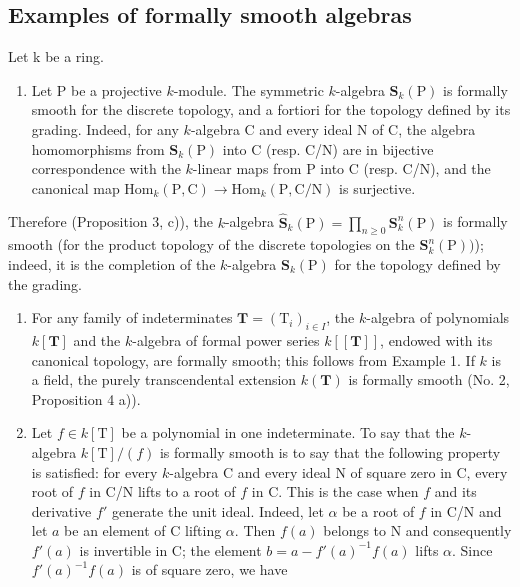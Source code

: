 \subsection{Examples of formally smooth algebras}

Let k be a ring.

\begin{enumerate}
\def\labelenumi{\arabic{enumi})}
\tightlist
\item
  Let P be a projective \(k\)-module. The symmetric \(k\)-algebra \(\mathbf{S}_k(\mathrm{P})\) is formally smooth for the discrete topology, and a fortiori for the topology defined by its grading. Indeed, for any \(k\)-algebra C and every ideal N of C, the algebra homomorphisms from \(\mathbf{S}_k(\mathrm{P})\) into C (resp. C/N) are in bijective correspondence with the \(k\)-linear maps from P into C (resp. C/N), and the canonical map \(\mathrm{Hom}_k(\mathrm{P},\mathrm{C}) \to \mathrm{Hom}_k(\mathrm{P},\mathrm{C}/\mathrm{N})\) is surjective.
\end{enumerate}

Therefore (Proposition 3, c)), the \(k\)-algebra \(\widehat{\mathbf{S}}_k(\mathrm{P}) = \prod_{n\geqslant 0}\mathbf{S}_k^n (\mathrm{P})\) is formally smooth (for the product topology of the discrete topologies on the \(\mathbf{S}_k^n (\mathrm{P}))\)); indeed, it is the completion of the \(k\)-algebra \(\mathbf{S}_k(\mathrm{P})\) for the topology defined by the grading.

\begin{enumerate}
\def\labelenumi{\arabic{enumi})}
\setcounter{enumi}{1}
\item
  For any family of indeterminates \(\mathbf{T} = (\mathrm{T}_i)_{i\in I}\), the \(k\)-algebra of polynomials \(k[\mathbf{T}]\) and the \(k\)-algebra of formal power series \(k[[\mathbf{T}]]\), endowed with its canonical topology, are formally smooth; this follows from Example 1. If \(k\) is a field, the purely transcendental extension \(k(\mathbf{T})\) is formally smooth (No. 2, Proposition 4 a)).
\item
  Let \(f \in k[\mathrm{T}]\) be a polynomial in one indeterminate. To say that the \(k\)-algebra \(k[\mathrm{T}]/(f)\) is formally smooth is to say that the following property is satisfied: for every \(k\)-algebra C and every ideal N of square zero in C, every root of \(f\) in C/N lifts to a root of \(f\) in C. This is the case when \(f\) and its derivative \(f'\) generate the unit ideal. Indeed, let \(\alpha\) be a root of \(f\) in C/N and let \(a\) be an element of C lifting \(\alpha\). Then \(f(a)\) belongs to N and consequently \(f'(a)\) is invertible in C; the element \(b = a - f'(a)^{-1}f(a)\) lifts \(\alpha\). Since \(f'(a)^{-1}f(a)\) is of square zero, we have
\end{enumerate}

